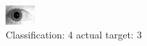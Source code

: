 \begin{figure}[h!]
\begin{center}
\includegraphics[width=0.60\columnwidth]{figures/ID1944_class_4_target_3.png}
\end{center}
\caption{ Classification: 4 actual target: 3}
\label{fig:ID1944_class_4_target_3}
\end{figure}
